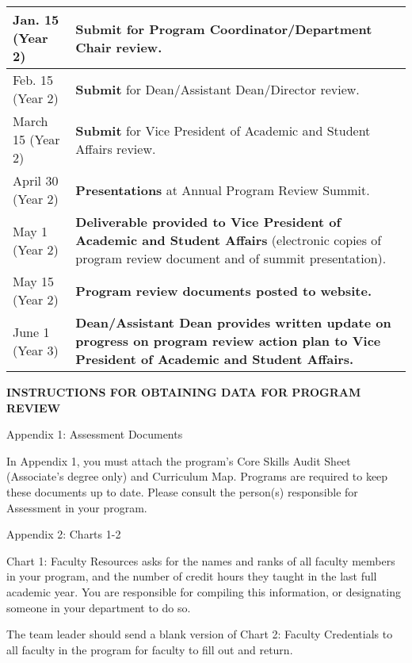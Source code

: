 \begin{center}
\begin{longtable}[c]{|p{5cm}|p{10cm}|}
 Jan. 15 (Year 2) & \textbf{Submit} for Program Coordinator/Department Chair review. 
 \\
 \hline
Feb. 15 (Year 2) & \textbf{Submit} for Dean/Assistant Dean/Director review. 
\\
 \hline
 March 15 (Year 2)& \textbf{Submit} for Vice President of Academic and Student Affairs review. 
 \\
 \hline
April 30 (Year 2) & \textbf{Presentations} at Annual Program Review Summit. \\
 \hline
 May 1 (Year 2) & \textbf{Deliverable provided to Vice President of Academic and Student Affairs} (electronic copies of program review document and of summit presentation).  \\
 \hline
 May 15 (Year 2) & \textbf{Program review documents posted to website.}  \\ 
 \hline
June 1 (Year 3) & \textbf{Dean/Assistant Dean provides written update on progress on program review action plan to Vice President of Academic and Student Affairs.}  \\ [1ex] 
 \hline
\end{longtable}
\end{center}























\textbf{INSTRUCTIONS FOR OBTAINING DATA FOR PROGRAM REVIEW}

Appendix 1: Assessment Documents

In Appendix 1, you must attach the program’s Core Skills Audit Sheet (Associate’s degree only) and Curriculum Map. Programs are required to keep these documents up to date. Please consult the person(s) responsible for Assessment in your program.


Appendix 2: Charts 1-2

Chart 1: Faculty Resources asks for the names and ranks of all faculty members in your program, and the number of credit hours they taught in the last full academic year. You are responsible for compiling this information, or designating someone in your department to do so.

The team leader should send a blank version of Chart 2: Faculty Credentials to all faculty in the program for faculty to fill out and return.


